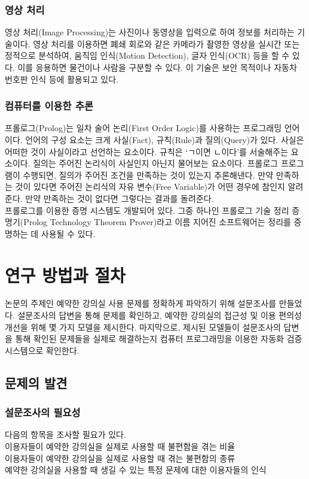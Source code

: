 \documentclass[11pt,a4paper]{article}
\begin{document}
\subsubsection{영상 처리}
영상 처리(Image Processing)는 사진이나 동영상을 입력으로 하여 정보를 처리하는 기술이다. 영상 처리를 이용하면 폐쇄 회로와 같은 카메라가 촬영한 영상을 실시간 또는 정적으로 분석하여, 움직임 인식(Motion Detection), 글자 인식(OCR) 등을 할 수 있다. 이를 응용하면 물건이나 사람을 구분할 수 있다. 이 기술은 보안 목적이나 자동차 번호판 인식 등에 활용되고 있다.

\subsubsection{컴퓨터를 이용한 추론}
프롤로그(Prolog)는 일차 술어 논리(First Order Logic)를 사용하는 프로그래밍 언어이다. 언어의 구성 요소는 크게 사실(Fact), 규칙(Rule)과 질의(Query)가 있다. 사실은 어떠한 것이 사실이라고 선언하는 요소이다. 규칙은 ‘ㄱ이면 ㄴ이다’를 서술해주는 요소이다. 질의는 주어진 논리식이 사실인지 아닌지 물어보는 요소이다. 프롤로그 프로그램이 수행되면, 질의가 주어진 조건을 만족하는 것이 있는지 추론해낸다. 만약 만족하는 것이 있다면 주어진 논리식의 자유 변수(Free Variable)가 어떤 경우에 참인지 알려준다. 만약 만족하는 것이 없다면 그렇다는 결과를 돌려준다.\\
프롤로그를 이용한 증명 시스템도 개발되어 있다. 그중 하나인 프롤로그 기술 정리 증명기(Prolog Technology Theorem Prover)라고 이름 지어진 소프트웨어는 정리를 증명하는 데 사용될 수 있다.

\section{연구 방법과 절차}
논문의 주제인 예약한 강의실 사용 문제를 정확하게 파악하기 위해 설문조사를 만들었다. 설문조사의 답변을 통해 문제를 확인하고, 예약한 강의실의 접근성 및 이용 편의성 개선을 위해 몇 가지 모델을 제시한다. 마지막으로, 제시된 모델들이 설문조사의 답변을 통해 확인된 문제들을 실제로 해결하는지 컴퓨터 프로그래밍을 이용한 자동화 검증 시스템으로 확인한다.

\subsection{문제의 발견}

\subsubsection{설문조사의 필요성}
다음의 항목을 조사할 필요가 있다.\\
이용자들이 예약한 강의실을 실제로 사용할 때 불편함을 겪는 비율\\
이용자들이 예약한 강의실을 실제로 사용할 때 겪는 불편함의 종류\\
예약한 강의실을 사용할 때 생길 수 있는 특정 문제에 대한 이용자들의 인식
\end{document}
